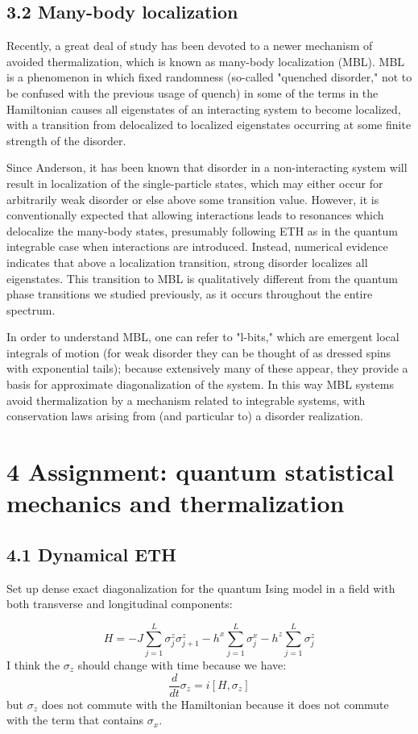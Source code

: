 \documentclass[12pt]{article}
\begin{document}
\subsection*{3.2 Many-body localization}
Recently, a great deal of study has been devoted to a newer mechanism of avoided thermalization, which is known as many-body localization (MBL). MBL is a phenomenon in which fixed randomness (so-called "quenched disorder," not to be confused with the previous usage of quench) in some of the terms in the Hamiltonian causes all eigenstates of an interacting system to become localized, with a transition from delocalized to localized eigenstates occurring at some finite strength of the disorder.

Since Anderson, it has been known that disorder in a non-interacting system will result in localization of the single-particle states, which may either occur for arbitrarily weak disorder or else above some transition value. However, it is conventionally expected that allowing interactions leads to resonances which delocalize the many-body states, presumably following ETH as in the quantum integrable case when interactions are introduced. Instead, numerical evidence indicates that above a localization transition, strong disorder localizes all eigenstates. This transition to MBL is qualitatively different from the quantum phase transitions we studied previously, as it occurs throughout the entire spectrum.

In order to understand MBL, one can refer to "l-bits," which are emergent local integrals of motion (for weak disorder they can be thought of as dressed spins with exponential tails); because extensively many of these appear, they provide a basis for approximate diagonalization of the system. In this way MBL systems avoid thermalization by a mechanism related to integrable systems, with conservation laws arising from (and particular to) a disorder realization.

\section*{4 Assignment: quantum statistical mechanics and thermalization}
\subsection*{4.1 Dynamical ETH}
Set up dense exact diagonalization for the quantum Ising model in a field with both transverse and longitudinal components:


\begin{equation*}
H=-J \sum_{j=1}^{L} \sigma_{j}^{z} \sigma_{j+1}^{z}-h^{x} \sum_{j=1}^{L} \sigma_{j}^{x}-h^{z} \sum_{j=1}^{L} \sigma_{j}^{z} \tag{8}
\end{equation*}
I think the $\sigma _z$ should change with time because we have:
\begin{equation}
    \frac{d}{dt} \sigma _z = i[H, \sigma _z]
\end{equation}
but $\sigma _z$ does not commute with the Hamiltonian because it does not commute with the term that contains $\sigma_x$.
\end{document}
